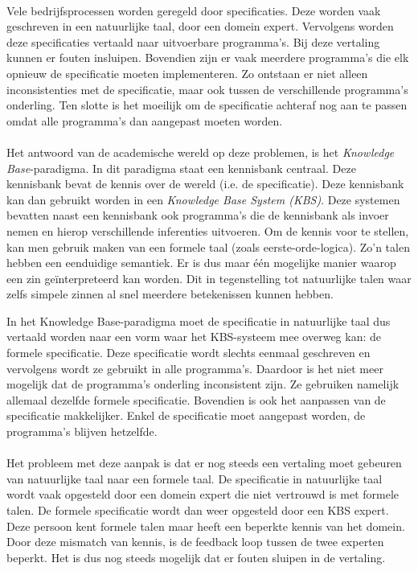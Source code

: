 \paragraph{} Vele bedrijfsprocessen worden geregeld door specificaties. Deze worden vaak geschreven in een natuurlijke taal, door een domein expert. Vervolgens worden deze specificaties vertaald naar uitvoerbare programma's. Bij deze vertaling kunnen er fouten insluipen. Bovendien zijn er vaak meerdere programma's die elk opnieuw de specificatie moeten implementeren. Zo ontstaan er niet alleen inconsistenties met de specificatie, maar ook tussen de verschillende programma's onderling. Ten slotte is het moeilijk om de specificatie achteraf nog aan te passen omdat alle programma's dan aangepast moeten worden.

\paragraph{} Het antwoord van de academische wereld op deze problemen, is het \textit{Knowledge Base}-paradigma. In dit paradigma staat een kennisbank centraal. Deze kennisbank bevat de kennis over de wereld (i.e. de specificatie). Deze kennisbank kan dan gebruikt worden in een \textit{Knowledge Base System (KBS)}. Deze systemen bevatten naast een kennisbank ook programma's die de kennisbank als invoer nemen en hierop verschillende inferenties uitvoeren. Om de kennis voor te stellen, kan men gebruik maken van een formele taal (zoals eerste-orde-logica). Zo'n talen hebben een eenduidige semantiek. Er is dus maar één mogelijke manier waarop een zin geïnterpreteerd kan worden. Dit in tegenstelling tot natuurlijke talen waar zelfs simpele zinnen al snel meerdere betekenissen kunnen hebben.

In het Knowledge Base-paradigma moet de specificatie in natuurlijke taal dus vertaald worden naar een vorm waar het KBS-systeem mee overweg kan: de formele specificatie. Deze specificatie wordt slechts eenmaal geschreven en vervolgens wordt ze gebruikt in alle programma's. Daardoor is het niet meer mogelijk dat de programma's onderling inconsistent zijn. Ze gebruiken namelijk allemaal dezelfde formele specificatie. Bovendien is ook het aanpassen van de specificatie makkelijker. Enkel de specificatie moet aangepast worden, de programma's blijven hetzelfde.

\paragraph{} Het probleem met deze aanpak is dat er nog steeds een vertaling moet gebeuren van natuurlijke taal naar een formele taal. De specificatie in natuurlijke taal wordt vaak opgesteld door een domein expert die niet vertrouwd is met formele talen. De formele specificatie wordt dan weer opgesteld door een KBS expert. Deze persoon kent formele talen maar heeft een beperkte kennis van het domein. Door deze mismatch van kennis, is de feedback loop tussen de twee experten beperkt. Het is dus nog steeds mogelijk dat er fouten sluipen in de vertaling.

